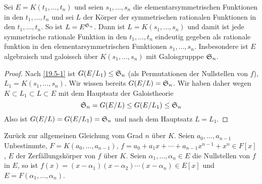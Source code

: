 \begin{kor} \label{20.4-8}
	Sei $E = K(t_1, \dotsc, t_n)$ und seien $s_1, \dotsc, s_n$ die elementarsymmetrischen Funktionen in den $t_1, \dotsc, t_n$ und sei $L$ der Körper der symmetrischen rationalen Funktionen in den $t_1, \dotsc, t_n$.
	So ist $L = E^{\S_n}$.
	Dann ist $L = K(s_1, \dotsc, s_n)$ und damit ist jede symmetrische rationale Funktion in den $t_1, \dotsc, t_n$ eindeutig gegeben als rationale funktion in den elementarsymmetrischen Funktionen $s_1, \dotsc, s_n$.
	Insbesondere ist $E$ algebraisch und galoissch über $K(s_1, \dotsc, s_n)$ mit Galoisgrupppe $\S_n$.
	\begin{proof}
		Nach \ref{19.5-1} ist $G(E / L_1) \le \S_n$ (als Permutationen der Nullstellen von $f$), $L_1 = K(s_1, \dotsc, s_n)$.
		Wir wissen bereits $G(E / L) = \S_n$.
		Wir haben daher wegen $K \subset L_1 \subset L \subset E$ mit dem Hauptsatz der Galoistheorie
		\[
			\S_n = G(E / L)
			\le G(E / L_1)
			\le \S_n
		\]
		Also ist $G(E / L) = G(E / L_1) = \S_n$ und nach dem Hauptsatz $L = L_1$.
	\end{proof}
\end{kor}

Zurück zur allgemeinen Gleichung vom Grad $n$ über $K$.
Seien $a_0, \dotsc, a_{n-1}$ Unbestimmte, $F = K(a_0, \dotsc, a_{n-1})$, $f = a_0 + a_1 x + \dotsb + a_{n-1} x^{n-1} + x^n \in F[x]$, $E$ der Zerfällungskörper von $f$ über $K$.
Seien $\alpha_1, \dotsc, \alpha_n \in E$ die Nullstellen von $f$ in $E$, so ist $f(x) = (x-\alpha_1)(x-\alpha_2) \dotsb (x- \alpha_n) \in E[x]$ und $E = F(\alpha_1, \dotsc, \alpha_n)$.

